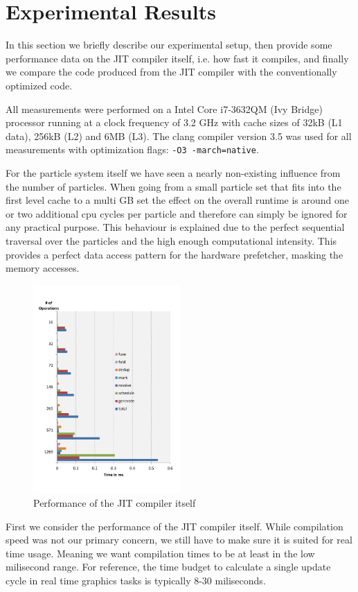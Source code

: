 \section{Experimental Results}\label{sec:exp}
In this section we briefly describe our experimental setup, then provide some performance data on the JIT compiler itself, i.e. how fast it compiles, and finally we compare the code produced from the JIT compiler with the conventionally optimized code.

All measurements were performed on a Intel Core i7-3632QM (Ivy Bridge) processor running at a clock frequency of 3.2 GHz with cache sizes of 32kB (L1 data), 256kB (L2) and 6MB (L3). The clang compiler version 3.5 was used for all measurements with optimization flags: \texttt{-O3 -march=native}.

For the particle system itself we have seen a nearly non-existing influence from the number of particles. When going from a small particle set that fits into the first level cache to a multi GB set the effect on the overall runtime is around one or two additional cpu cycles per particle and therefore can simply be ignored for any practical purpose. This behaviour is explained due to the perfect sequential traversal over the particles and the high enough computational intensity.
This provides a perfect data access pattern for the hardware prefetcher, masking the memory accesses.


\begin{figure}[t]\centering
  \includegraphics[width=0.5\textwidth]{jit_perf.pdf}
  \caption{Performance of the JIT compiler itself
  \label{perf_jit}}
\end{figure}
First we consider the performance of the JIT compiler itself. While compilation speed was not our primary concern, we still have to make sure it is suited for real time usage. Meaning we want compilation times to be at least in the low milisecond range. For reference, the time budget to calculate a single update cycle in real time graphics tasks is typically 8-30 miliseconds.

